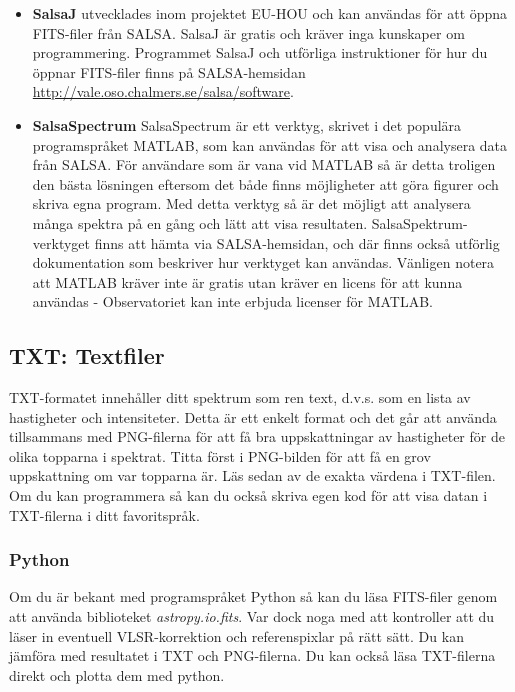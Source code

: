 \begin{itemize}
	\item \textbf{SalsaJ} utvecklades inom projektet EU-HOU och kan användas 
		för att öppna FITS-filer från SALSA.
		SalsaJ är gratis och kräver inga kunskaper om programmering. Programmet SalsaJ och utförliga instruktioner för hur du öppnar FITS-filer finns
		på SALSA-hemsidan {\url{http://vale.oso.chalmers.se/salsa/software}}.
	\item \textbf{SalsaSpectrum} SalsaSpectrum är ett verktyg, skrivet i det
		populära programspråket MATLAB, som kan användas för att visa och
		analysera data från SALSA. För användare som är vana vid MATLAB så är
		detta troligen den bästa lösningen eftersom det både finns möjligheter
		att göra figurer och skriva egna program. Med detta verktyg så är det
		möjligt att analysera många spektra på en gång och lätt att visa
		resultaten.  SalsaSpektrum-verktyget finns att hämta via
		SALSA-hemsidan, och där finns också utförlig dokumentation som
		beskriver hur verktyget kan användas. Vänligen notera att MATLAB kräver
		inte är gratis utan kräver en licens för att kunna användas -
		Observatoriet kan inte erbjuda licenser för MATLAB.
\end{itemize}

\subsection{TXT: Textfiler}
TXT-formatet innehåller ditt spektrum som ren text, d.v.s. som en lista av
hastigheter och intensiteter. Detta är ett enkelt format och det går att använda 
tillsammans med PNG-filerna för att få bra uppskattningar av hastigheter för de olika
topparna i spektrat. Titta först i PNG-bilden för att få en grov uppskattning om var topparna är.
Läs sedan av de exakta värdena i TXT-filen. 
Om du kan programmera så kan du också skriva egen
kod för att visa datan i TXT-filerna i ditt favoritspråk. 

\subsubsection{Python}
Om du är bekant med programspråket Python så kan du läsa FITS-filer genom att
använda biblioteket \emph{astropy.io.fits}. Var dock noga med att kontroller
att du läser in eventuell VLSR-korrektion och referenspixlar på rätt sätt. Du
kan jämföra med resultatet i TXT och PNG-filerna.  Du kan också läsa
TXT-filerna direkt och plotta dem med python.
